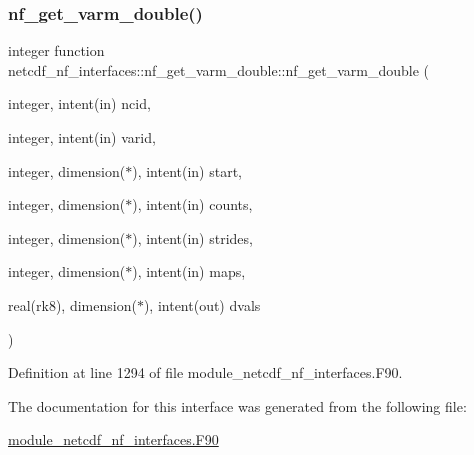 \subsubsection{\texorpdfstring{nf\+\_\+get\+\_\+varm\+\_\+double()}{nf\_get\_varm\_double()}}
{\footnotesize\ttfamily integer function netcdf\+\_\+nf\+\_\+interfaces\+::nf\+\_\+get\+\_\+varm\+\_\+double\+::nf\+\_\+get\+\_\+varm\+\_\+double (\begin{DoxyParamCaption}\item[{integer, intent(in)}]{ncid,  }\item[{integer, intent(in)}]{varid,  }\item[{integer, dimension($\ast$), intent(in)}]{start,  }\item[{integer, dimension($\ast$), intent(in)}]{counts,  }\item[{integer, dimension($\ast$), intent(in)}]{strides,  }\item[{integer, dimension($\ast$), intent(in)}]{maps,  }\item[{real(rk8), dimension($\ast$), intent(out)}]{dvals }\end{DoxyParamCaption})}



Definition at line 1294 of file module\+\_\+netcdf\+\_\+nf\+\_\+interfaces.\+F90.



The documentation for this interface was generated from the following file\+:\begin{DoxyCompactItemize}
\item 
\hyperlink{module__netcdf__nf__interfaces_8F90}{module\+\_\+netcdf\+\_\+nf\+\_\+interfaces.\+F90}\end{DoxyCompactItemize}
